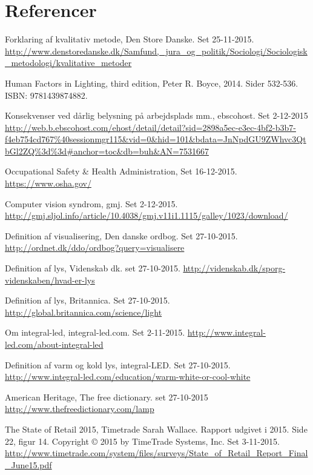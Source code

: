 \section{Referencer}

\begin{thebibliography}{99}


  Forklaring af kvalitativ metode,
  Den Store Danske.
  Set 25-11-2015.
  \url{http://www.denstoredanske.dk/Samfund,_jura_og_politik/Sociologi/Sociologisk_metodologi/kvalitative_metoder}

  Human Factors in Lighting, third edition,
  Peter R. Boyce, 2014.
  Sider 532-536.
  ISBN: 9781439874882.

  Konsekvenser ved dårlig belysning på arbejdsplads mm.,
  ebscohost.
  Set 2-12-2015
  \url{http://web.b.ebscohost.com/ehost/detail/detail?sid=2898a5ec-e3ec-4bf2-b3b7-f4eb754cd767%40sessionmgr115&vid=0&hid=101&bdata=JnNpdGU9ZWhvc3QtbGl2ZQ%3d%3d#anchor=toc&db=buh&AN=7531667}

  Occupational Safety & Health Administration,
  Set 16-12-2015.
  \url{https://www.osha.gov/}
  
  Computer vision syndrom,
  gmj.
  Set 2-12-2015.
  \url{http://gmj.sljol.info/article/10.4038/gmj.v11i1.1115/galley/1023/download/}
  
  Definition af visualisering,
  Den danske ordbog.
  Set 27-10-2015.
  \url{http://ordnet.dk/ddo/ordbog?query=visualisere}
  
  Definition af lys,
  Videnskab dk.
  set 27-10-2015.
  \url{http://videnskab.dk/sporg-videnskaben/hvad-er-lys}
  
  Definition af lys,
  Britannica.
  Set 27-10-2015.
  \url{http://global.britannica.com/science/light}

  Om integral-led,
  integral-led.com.
  Set 2-11-2015.
  \url{http://www.integral-led.com/about-integral-led}
  
  Definition af varm og kold lys,
  integral-LED.
  Set 27-10-2015.
  \url{http://www.integral-led.com/education/warm-white-or-cool-white}

  American Heritage,
  The free dictionary.
  set 27-10-2015
  \url{http://www.thefreedictionary.com/lamp}

  The State of Retail 2015,
  Timetrade
  Sarah Wallace.
  Rapport udgivet i 2015.
  Side 22, figur 14.
  Copyright © 2015 by TimeTrade Systems, Inc.
  Set 3-11-2015.
  \url{http://www.timetrade.com/system/files/surveys/State_of_Retail_Report_Final_June15.pdf}


\end{thebibliography}
